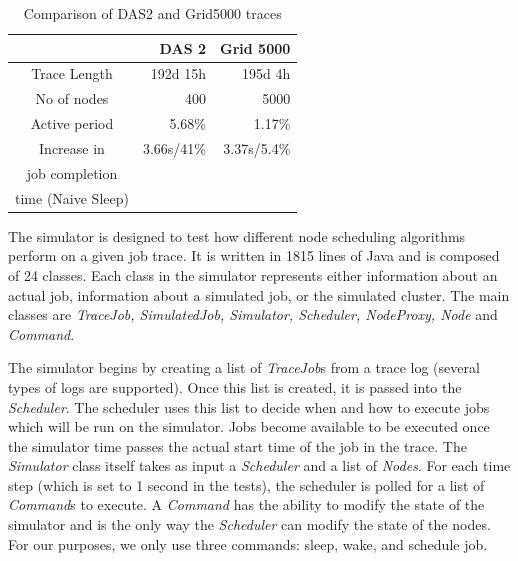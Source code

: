 \begin{table}
    \centering
    \label{tab:trace-comp}
    \begin{tabular}{|c|r|r|}
        \hline
        & {\bf DAS 2} & {\bf Grid 5000} \\
        \hline
        Trace Length & 192d 15h & 195d 4h\\
        \hline
        No of nodes & 400 & 5000 \\
        \hline
        Active period & 5.68\% & 1.17\% \\
        \hline
        Increase in & 3.66s/41\% & 3.37s/5.4\%\\
        job completion & & \\
        time (Naive Sleep) & &\\
        \hline
    \end{tabular}
    \caption{Comparison of DAS2 and Grid5000 traces}
\end{table}

The simulator is designed to test how different node scheduling algorithms perform on a given job trace. It is written in 1815 lines of Java and is composed of 24 classes. Each class in the simulator represents either information about an actual job, information about a simulated job, or the simulated cluster. The main classes are {\em TraceJob, SimulatedJob, Simulator, Scheduler, NodeProxy, Node} and {\em Command}. 

The simulator begins by creating a list of \emph{TraceJob}s from a trace log (several types of logs are supported). Once this list is created, it is passed into the \emph{Scheduler}. The scheduler uses this list to decide when and how to execute jobs which will be run on the simulator. Jobs become available to be executed once the simulator time passes the actual start time of the job in the trace. The \emph{Simulator} class itself takes as input a \emph{Scheduler} and a list of \emph{Nodes}. For each time step (which is set to 1 second in the tests), the scheduler is polled for a list of \emph{Command}s to execute. A \emph{Command} has the ability to modify the state of the simulator and is the only way the \emph{Scheduler} can modify the state of the nodes. For our purposes, we only use three commands: sleep, wake, and schedule job. %

